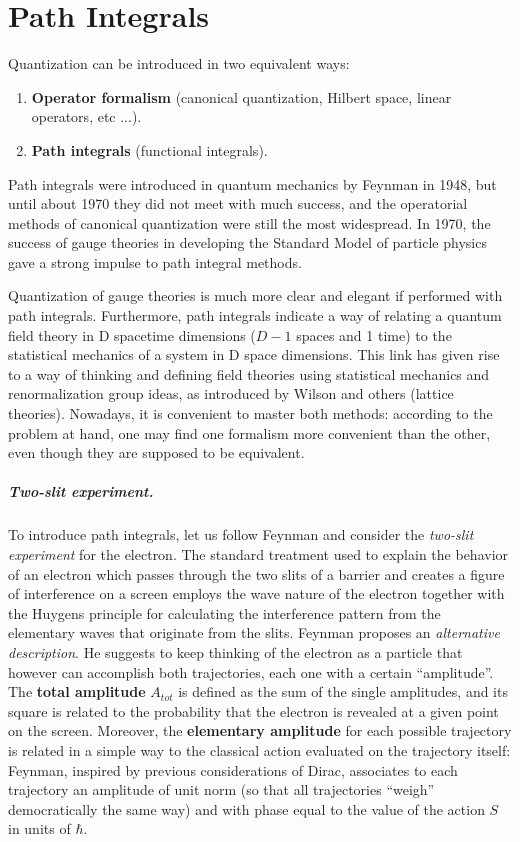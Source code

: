 \chapter{Path Integrals}

Quantization can be introduced in two equivalent ways:
\begin{enumerate}
    \item \textbf{Operator formalism} (canonical quantization, Hilbert space, linear operators, etc ...).
    \item \textbf{Path integrals} (functional integrals).
\end{enumerate}
Path integrals were introduced in quantum mechanics by Feynman in 1948, but until about 1970 they did not meet with much success, and the operatorial methods of canonical quantization were still the most widespread. In 1970, the success of gauge theories in developing the Standard Model of particle physics gave a strong impulse to path integral methods.

Quantization of gauge theories is much more clear and elegant if performed with path integrals. Furthermore, path integrals indicate a way of relating a quantum field theory in D spacetime dimensions (\(D-1\) spaces and 1 time) to the statistical mechanics of a system in D space dimensions. This link has given rise to a way of thinking and defining field theories using statistical mechanics and renormalization group ideas, as introduced by Wilson and others (lattice theories). Nowadays, it is convenient to master both methods: according to the problem at hand, one may find one formalism more convenient than the other, even though they are supposed to be equivalent.

\paragraph{Two-slit experiment.} To introduce path integrals, let us follow Feynman and consider the \textit{two-slit experiment} for the electron. The standard treatment used to explain the behavior of an electron which passes through the two slits of a barrier and creates a figure of interference on a screen employs the wave nature of the electron together with the Huygens principle for calculating the interference pattern from the elementary waves that originate from the slits. Feynman proposes an \textit{alternative description}. He suggests to keep thinking of the electron as a particle that however can accomplish both trajectories, each one with a certain “amplitude”.
The \textbf{total amplitude} \(A_{tot}\) is defined as the sum of the single amplitudes, and its square is related to the probability that the electron is revealed at a given point on the screen. Moreover, the \textbf{elementary amplitude} for each possible trajectory is related in a simple way to the classical action evaluated on the trajectory itself: Feynman, inspired by previous considerations of Dirac, associates to each trajectory an amplitude of unit norm (so that all trajectories “weigh” democratically the same way) and with phase equal to the value of the action \(S\) in units of \(\hbar\).

